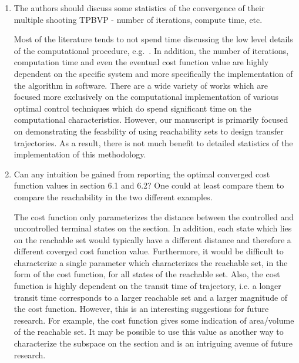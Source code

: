 \documentclass[11pt]{article}
\begin{document}
\begin{enumerate}
\item 
    \begin{itshape}
The authors should discuss some statistics of the convergence of their multiple shooting TPBVP - number of iterations, compute time, etc.
\end{itshape}

Most of the literature tends to not spend time discussing the low level details of the computational procedure, e.g.~\cite{grebow2011,stuart2010}.
In addition, the number of iterations, computation time and even the eventual cost function value are highly dependent on the specific system and more specifically the implementation of the algorithm in software. 
There are a wide variety of works which are focused more exclusively on the computational implementation of various optimal control techniques which do spend significant time on the computational characteristics.
However, our manuscript is primarily focused on demonstrating the feasbility of using reachability sets to design transfer trajectories.
As a result, there is not much benefit to detailed statistics of the implementation of this methodology.

\item 
    \begin{itshape}
Can any intuition be gained from reporting the optimal converged cost function values in section 6.1 and 6.2?  One could at least compare them to compare the reachability in the two different examples.
\end{itshape}

The cost function only parameterizes the distance between the controlled and uncontrolled terminal states on the \Poincare section. 
In addition, each state which lies on the reachable set would typically have a different distance and therefore a different coverged cost function value. 
Furthermore, it would be difficult to characterize a single parameter which characterizes the reachable set, in the form of the cost function, for all states of the reachable set. 
Also, the cost function is highly dependent on the transit time of trajectory, i.e. a longer transit time corresponds to a larger reachable set and a larger magnitude of the cost function.
However, this is an interesting suggestions for future research.
For example, the cost function gives some indication of area/volume of the reachable set. 
It may be possible to use this value as another way to characterize the subspace on the \Poincare section and is an intriguing avenue of future research.


\end{enumerate}
\end{document}
